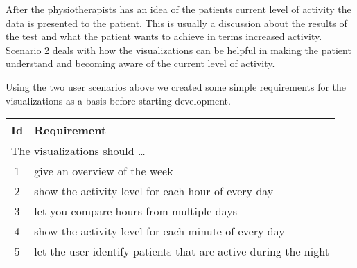 After the physiotherapists has an idea of the patients current level of activity the data is presented to the patient. This is usually a discussion about the results of the test and what the patient wants to achieve in terms increased activity. Scenario 2 deals with how the visualizations can be helpful in making the patient understand and becoming aware of the current level of activity.

Using the two user scenarios above we created some simple requirements for the visualizations as a basis before starting development.

\begin{table}[h!]
  \begin{center}
  \begin{tabular}{|c|p{12cm}|}
    \hline
      \textbf{Id} & \textbf{Requirement} \\ \hline
    \multicolumn{2}{|l|}{The visualizations should \ldots} \\ \hline
      1 & give an overview of the week \\ \hline
      2 & show the activity level for each hour of every day \\ \hline
      3 & let you compare hours from multiple days \\ \hline
      4 & show the activity level for each minute of every day \\ \hline
      5 & let the user identify patients that are active during the night \\ \hline
  \end{tabular}
  \end{center}
\end{table}
 
